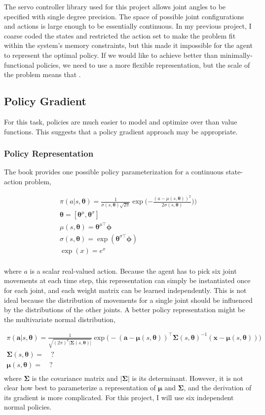 \documentclass{article}
\newcommand{\thetab}{\bm{\theta}}
\newcommand{\phib}{\bm{\phi}}
\begin{document}
The servo controller library used for this project allows joint angles to be specified with single degree precision. The space of possible joint configurations and actions is large enough to be essentially continuous. In my previous project, I coarse coded the states and restricted the action set to make the problem fit within the system's memory constraints, but this made it impossible for the agent to represent the optimal policy. If we would like to achieve better than minimally-functional policies, we need to use a more flexible representation, but the scale of the problem means that .

\subsection{Policy Gradient}

For this task, policies are much easier to model and optimize over than value functions. This suggests that a policy gradient approach may be appropriate. 

\subsubsection{Policy Representation}
The book provides one possible policy parameterization for a continuous state-action problem,

\begin{gather*}
	\pi (a | s, \thetab) =  \frac{1}{\sigma(s, \thetab)\sqrt{2\pi}}\exp\bigg({-\frac{(a - \mu(s, {\thetab}))^2}{2\sigma(s, \thetab)})}\bigg)\\
	\thetab = [\thetab^\mu, \thetab^\sigma] \\
	\mu(s, \thetab) = \thetab^{\mu\top}\phib\\
	\sigma(s, \thetab) = \exp(\thetab^{\sigma\top}\phib)\\
	\exp(x) = e^x\\
\end{gather*}

where $a$ is a scalar real-valued action. Because the agent has to pick six joint movements at each time step, this representation can simply be instantiated once for each joint, and each weight matrix can be learned independently. This is not ideal because the distribution of movements for a single joint should be influenced by the distributions of the other joints. A better policy representation might be the multivariate normal distribution,

\begin{gather*}
	\pi (\bm{a} | s, \thetab) =  \frac{1}{\sqrt{(2\pi)^k|\bm{\Sigma}(s, \thetab)|}} \exp\bigg(-(\bm{a} - \bm{\mu}(s, {\thetab}))^\top \bm{\Sigma}(s, \thetab)^{-1}{(\bm{x} - \bm{\mu}(s, \thetab))}\bigg)\\
		\bm{\Sigma}(s, \thetab) =\quad?\\
		\bm{\mu}(s, {\thetab}) =\quad?\\
\end{gather*}
where $\bm{\Sigma}$ is the covariance matrix and $|\bm{\Sigma}|$ is its determinant. However, it is not clear how best to parameterize a representation of $\bm{\mu}$ and $\bm{\Sigma}$, and the derivation of its gradient is more complicated. For this project, I will use six independent normal policies.
\end{document}
